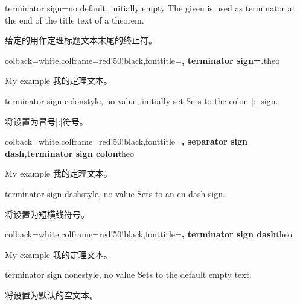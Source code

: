 \begin{docTcbKey}{terminator sign}{=}{no default, initially empty}
The given  is used as terminator at the end of the title text of a theorem.

给定的用作定理标题文本末尾的终止符。
\begin{dispExample}
%
  {colback=white,colframe=red!50!black,fonttitle=\bfseries,
   terminator sign={.}}{theo}
\begin{sometheorem}{My example}{}
我的定理文本。
\end{sometheorem}
\end{dispExample}
\end{docTcbKey}

\begin{docTcbKey}{terminator sign colon}{}{style, no value, initially set}
Sets  to the colon |:| sign.

将设置为冒号|:|符号。
\begin{dispExample}
%
  {colback=white,colframe=red!50!black,fonttitle=\bfseries,
   separator sign dash,terminator sign colon}{theo}
\begin{sometheorem}{My example}{}
我的定理文本。
\end{sometheorem}
\end{dispExample}
\end{docTcbKey}

\begin{docTcbKey}{terminator sign dash}{}{style, no value}
Sets  to an en-dash sign.

将设置为短横线符号。
\begin{dispExample}
%
  {colback=white,colframe=red!50!black,fonttitle=\bfseries,
   terminator sign dash}{theo}
\begin{sometheorem}{My example}{}
我的定理文本。
\end{sometheorem}
\end{dispExample}
\end{docTcbKey}

\begin{docTcbKey}{terminator sign none}{}{style, no value}
Sets  to the default empty text.

将设置为默认的空文本。
\end{docTcbKey}


